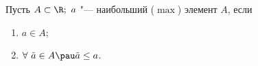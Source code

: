 
    Пусть $A\subset\R;\ a$ "--- наибольший ($\max$) элемент $A$, если
    \begin{enumerate}
        \item $a\in A$;
        \item $\forall\  \tilde a\in A\pau \tilde a\leq a$.
    \end{enumerate}
